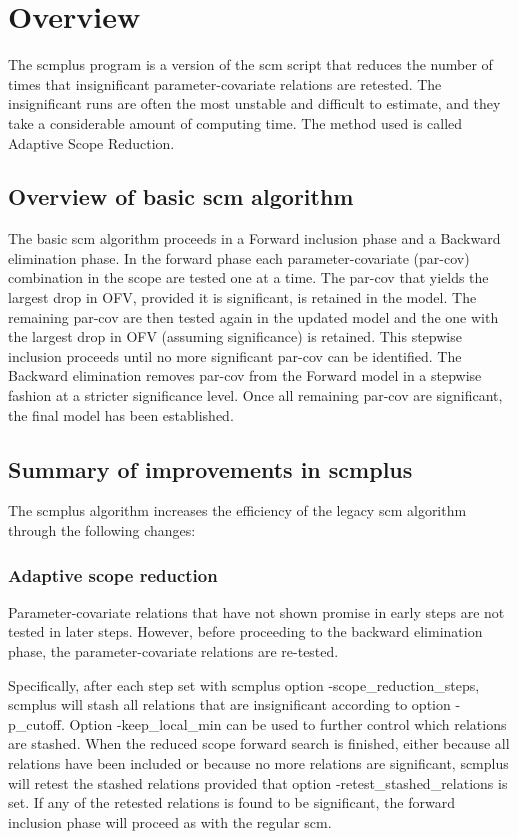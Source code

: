 \documentclass[hideglossary,notoc,hidelof,hidelot,hideTheSignaturePage,hideLinkCurrent,hideloa,pdfLatex,noClient,notitle,hideConfidential]{PMXstyle-20170118kajsa4}
\begin{document}
\section{Overview}
The scmplus program is a version of the scm script that reduces the number of times
that insignificant parameter-covariate relations are retested. The insignificant runs are often
the most unstable and difficult to estimate, and they take a considerable amount of computing time.
The method used is called Adaptive Scope Reduction.

\subsection{Overview of basic scm algorithm}

The basic scm algorithm proceeds in a Forward inclusion phase and a
Backward elimination phase. In the forward phase each parameter-covariate (par-cov) combination 
in the scope are tested one
at a time. The par-cov that yields the largest drop in OFV, provided it is
significant, is retained in the model. The remaining par-cov are then
tested again in the updated model and the one with the largest drop in
OFV (assuming significance) is retained. This stepwise inclusion
proceeds until no more significant par-cov can be identified. The
Backward elimination removes par-cov from the Forward model in a
stepwise fashion at a stricter significance level. Once all remaining par-cov 
are significant, the final model has been established.


\subsection{Summary of improvements in scmplus}
The scmplus algorithm increases the efficiency of the legacy scm
algorithm through the following changes:
\subsubsection{Adaptive scope reduction} 
Parameter-covariate relations that have
not shown promise in early steps are not tested in later steps. However,
before proceeding to the backward elimination phase, the 
parameter-covariate relations are re-tested. 

Specifically, after each step
set with scmplus option -scope\_reduction\_steps, scmplus will stash all relations that are insignificant
according to option -p\_cutoff. Option -keep\_local\_min can be used to further control which relations
are stashed.
When the reduced scope forward search is finished, either because all relations have been included or
because no more relations are significant, scmplus will retest the stashed relations provided that option
-retest\_stashed\_relations is set. If any of the retested relations is found to be significant,
the forward inclusion phase will proceed as with the regular scm.
\end{document}
